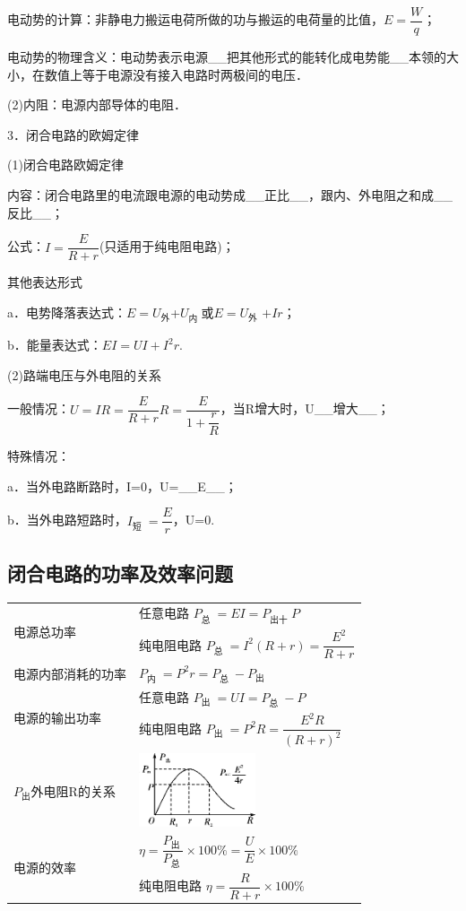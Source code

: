 \documentclass[cn,10.5pt,chinese,mac,chinesefont=founder]{elegantbook}
\begin{document}
电动势的计算：非静电力搬运电荷所做的功与搬运的电荷量的比值，$E=\dfrac{W}{q}$；

电动势的物理含义：电动势表示电源\_\_把其他形式的能转化成电势能\_\_本领的大小，在数值上等于电源没有接入电路时两极间的电压．

(2)内阻：电源内部导体的电阻．

3．闭合电路的欧姆定律

(1)闭合电路欧姆定律

内容：闭合电路里的电流跟电源的电动势成\_\_正比\_\_，跟内、外电阻之和成\_\_反比\_\_；

公式：$I=\dfrac{E}{R+r}$(只适用于纯电阻电路)；

其他表达形式

a．电势降落表达式：$E=U_{\text{外}}$+$U_{\text {内 }} $或$E=U_{\text{外}}$  $+I r$；

b．能量表达式：$E I=U I+I^{2} r$.

(2)路端电压与外电阻的关系

一般情况：$U=I R=\dfrac{E}{R+r} R=\dfrac{E}{1+\dfrac{r}{R}}$，当R增大时，U\_\_增大\_\_；

特殊情况：

a．当外电路断路时，I=0，U=\_\_E\_\_；

b．当外电路短路时，$I_{\text {短 }}=\dfrac{E}{r}$，U=0.

\newpage
\subsection{闭合电路的功率及效率问题}

\begin{longtable}[]{@{}m{4cm}m{10cm}@{}}
\toprule
\multirow{2}{3cm}{电源总功率} & 任意电路 $P_{\text {总 }}=E I=P_{\text {出十 }} P$\tabularnewline

& 纯电阻电路 $P_{\text {总 }}=I^{2}(R+r)=\dfrac{E^{2}}{R+r}$\tabularnewline
电源内部消耗的功率 & $P_{\text {内 }}=P^{2} r=P_{\text {总 }}-P_{\text {出 }}$\tabularnewline
\multirow{2}{3cm}{电源的输出功率} & 任意电路 $P_{\text {出 }}=U I=P_{\text {总 }}-P$\tabularnewline
& 纯电阻电路 $P_{\text {出 }}=P^{2} R=\dfrac{E^{2} R}{(R+r)^{2}}$\tabularnewline
$P_{\text{出}}$外电阻R的关系 &
\includegraphics[width=1.35833in,height=0.85833in]{media/image320.png}\tabularnewline
\multirow{2}{3cm}{电源的效率} & $\eta=\dfrac{P_{\text {出 }}}{P_{\text {总 }}} \times 100 \%=\dfrac{U}{E} \times 100 \%$\tabularnewline
& 纯电阻电路 $\eta=\dfrac{R}{R+r} \times 100 \%$\tabularnewline
\bottomrule
\end{longtable}
\end{document}
